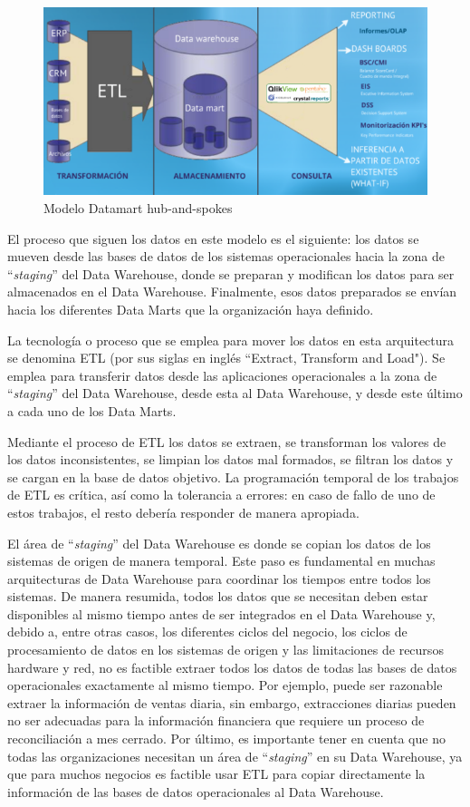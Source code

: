 \documentclass[a4paper, 12pt]{book}
\begin{document}
\begin{figure}
   \centering
   \includegraphics[width=12cm, keepaspectratio]{img/modelo_Datamart}
   \caption{Modelo Datamart hub-and-spokes}
   \label{fig:modelo_Datamart}
\end{figure}

El proceso que siguen los datos en este modelo es el siguiente: los datos se mueven desde las bases de datos de los sistemas operacionales hacia la zona de “\textit{staging}” del Data Warehouse, donde se preparan y modifican los datos para ser almacenados en el Data Warehouse. Finalmente, esos datos preparados se envían hacia los diferentes Data Marts que la organización haya definido. 

La tecnología o proceso que se emplea para mover los datos en esta arquitectura se denomina ETL (por sus siglas en inglés ``Extract, Transform and Load"). Se emplea para transferir datos desde las aplicaciones operacionales a la zona de “\textit{staging}” del Data Warehouse, desde esta al Data Warehouse, y desde este último a cada uno de los Data Marts.

Mediante el proceso de ETL los datos se extraen, se transforman los valores de los datos inconsistentes, se limpian los datos mal formados, se filtran los datos y se cargan en la base de datos objetivo. La programación temporal de los trabajos de ETL es crítica, así como la tolerancia a errores: en caso de fallo de uno de estos trabajos, el resto debería responder de manera apropiada.

El área de “\textit{staging}” del Data Warehouse es donde se copian los datos de los sistemas de origen de manera temporal. Este paso es fundamental en muchas arquitecturas de Data Warehouse para coordinar los tiempos entre todos los sistemas. De manera resumida, todos los datos que se necesitan deben estar disponibles al mismo tiempo antes de ser integrados en el Data Warehouse y, debido a, entre otras casos, los diferentes ciclos del negocio, los ciclos de procesamiento de datos en los sistemas de origen y las limitaciones de recursos hardware y red, no es factible extraer todos los datos de todas las bases de datos operacionales exactamente al mismo tiempo. Por ejemplo, puede ser razonable extraer la información de ventas diaria, sin embargo, extracciones diarias pueden no ser adecuadas para la información financiera que requiere un proceso de reconciliación a mes cerrado. Por último, es importante tener en cuenta que no todas las organizaciones necesitan un área de “\textit{staging}” en su Data Warehouse, ya que para muchos negocios es factible usar ETL para copiar directamente la información de las bases de datos operacionales al Data Warehouse.
\end{document}
